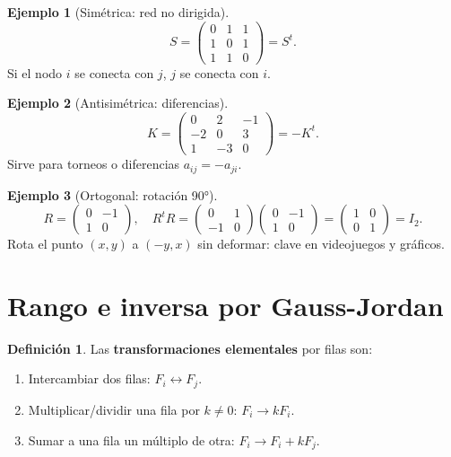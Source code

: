 \documentclass[a4paper,12pt]{article}
\theoremstyle{definition}
\newtheorem{definicion}{Definición}[section]
\newtheorem{ejemplo}{Ejemplo}[section]
\begin{document}
\begin{ejemplo}[Simétrica: red no dirigida]
\[
S=\begin{pmatrix} 0 & 1 & 1 \\ 1 & 0 & 1 \\ 1 & 1 & 0 \end{pmatrix}=S^t.
\]
Si el nodo $i$ se conecta con $j$, $j$ se conecta con $i$.
\end{ejemplo}

\begin{ejemplo}[Antisimétrica: diferencias]
\[
K=\begin{pmatrix} 0 & 2 & -1 \\ -2 & 0 & 3 \\ 1 & -3 & 0 \end{pmatrix}=-K^t.
\]
Sirve para torneos o diferencias $a_{ij}=-a_{ji}$.
\end{ejemplo}

\begin{ejemplo}[Ortogonal: rotación 90°]
\[
R=\begin{pmatrix} 0 & -1 \\ 1 & 0 \end{pmatrix}, \quad R^t R = \begin{pmatrix} 0 & 1 \\ -1 & 0 \end{pmatrix}\begin{pmatrix} 0 & -1 \\ 1 & 0 \end{pmatrix} = \begin{pmatrix} 1 & 0 \\ 0 & 1 \end{pmatrix}=I_2.
\]
Rota el punto $(x,y)$ a $(-y,x)$ sin deformar: clave en videojuegos y gráficos.
\end{ejemplo}

\newpage

\section{Rango e inversa por Gauss-Jordan}
\begin{definicion}
Las \textbf{transformaciones elementales} por filas son:
\begin{enumerate}[label=\arabic*.]
\item Intercambiar dos filas: $F_i \leftrightarrow F_j$.
\item Multiplicar/dividir una fila por $k \neq 0$: $F_i \to kF_i$.
\item Sumar a una fila un múltiplo de otra: $F_i \to F_i + kF_j$.
\end{enumerate}
\end{definicion}
\end{document}
